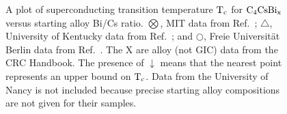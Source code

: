 \begin{figure}
\vspace{15cm}
\caption[Dependence of $\rm T_c$ on intercalant composition for MBi-GIC's ]{A plot of superconducting transition temperature $\rm T_c$ for
$\rm C_{4}CsBi_{x}$ versus  starting alloy Bi/Cs ratio.  $\bigotimes$, MIT
data from  Ref.~\cite{E291}; $\bigtriangleup$, University  of Kentucky data
from Ref.~\cite{yang88}; and  $\bigcirc$, Freie  Universit\"at Berlin  data
from Ref.~\cite{stang88}.   The X are  alloy (not GIC) data from the
CRC  Handbook.  The  presence  of  $\downarrow$  means that the   nearest point
represents an upper bound on $\rm T_c$.   Data from the University of Nancy
is not  included because precise starting  alloy compositions are not given
for their samples.}
\label{csbi:alloytc}
\end{figure}

